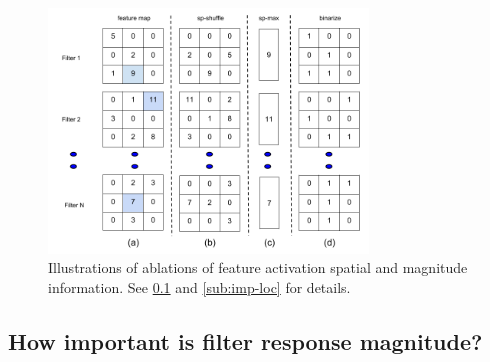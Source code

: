 \begin{figure}[t!]
\centering
\includegraphics[height=6.5cm]{images/features1.png}
\caption{Illustrations of ablations of feature activation spatial and magnitude information.
See \ref{sub:imp-mag} and \ref{sub:imp-loc} for details. }
\label{fig:features}
\end{figure}

\subsection{How important is filter response magnitude?}
\label{sub:imp-mag}
\setlength{\tabcolsep}{4pt}
\begin{table}[t!]
\begin{center}
\caption{Percentage non-zeros (sparsity) in filter responses of various layers of CNN.}
\label{table:sparse}
\vspace{0.3em}
\end{center}
\end{table}
\setlength{\tabcolsep}{1.4pt}

